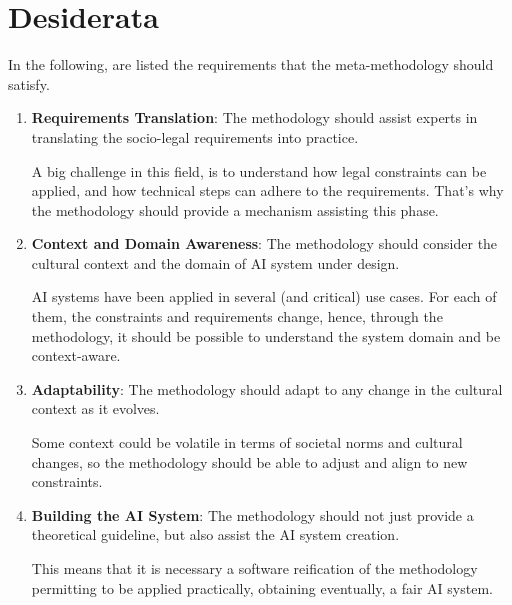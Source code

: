 \documentclass[12pt,a4paper,openright,twoside]{book}
\begin{document}

\section{Desiderata}\label{sec:desiderata}
In the following, are listed the requirements that the meta-methodology should satisfy.


\begin{enumerate}[label=\textbf{R\arabic*}, ref=R\arabic*]
    
    \item\label{req:R1} \textbf{Requirements Translation}: The methodology should assist experts in translating the socio-legal requirements into practice.

    A big challenge in this field, is to understand how legal constraints can be applied, and how technical steps can adhere to the requirements. That's why the methodology should provide a mechanism assisting this phase.
    
    \item\label{req:R2} \textbf{Context and Domain Awareness}: The methodology should consider the cultural context and the domain of \ac{AI} system under design.
    
    AI systems have been applied in several (and critical) use cases. For each of them, the constraints and requirements change, hence, through the methodology, it should be possible to understand the system domain and be context-aware.

    \item\label{req:R3} \textbf{Adaptability}: The methodology should adapt to any change in the cultural context as it evolves.
    
    Some context could be volatile in terms of societal norms and cultural changes, so the methodology should be able to adjust and align to new constraints.

    \item\label{req:R4} \textbf{Building the AI System}: The methodology should not just provide a theoretical guideline, but also assist the AI system creation. 
    
    This means that it is necessary a software reification of the methodology permitting to be applied practically, obtaining eventually, a fair AI system.
\end{enumerate}
\end{document}
